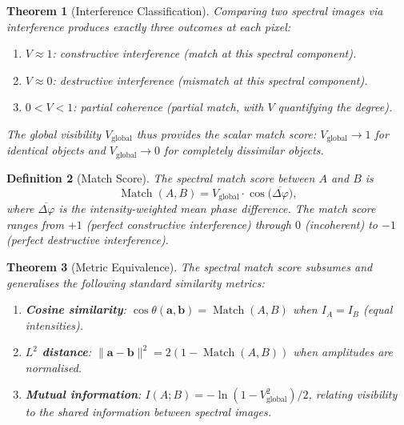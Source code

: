 \documentclass[11pt,twocolumn,a4paper]{article}
\newtheorem{theorem}{Theorem}[section]
\newtheorem{definition}[theorem]{Definition}
\DeclareMathOperator{\Match}{Match}
\begin{document}
\begin{theorem}[Interference Classification]
\label{thm:interference_classification}
Comparing two spectral images via interference produces exactly three
outcomes at each pixel:
\begin{enumerate}[label=(\roman*),nosep]
  \item $V \approx 1$: constructive interference (match at this spectral
    component).
  \item $V \approx 0$: destructive interference (mismatch at this
    spectral component).
  \item $0 < V < 1$: partial coherence (partial match, with $V$
    quantifying the degree).
\end{enumerate}
The global visibility $V_{\text{global}}$ thus provides the scalar
match score: $V_{\text{global}} \to 1$ for identical objects and
$V_{\text{global}} \to 0$ for completely dissimilar objects.
\end{theorem}

\begin{definition}[Match Score]
\label{def:match_score}
The spectral match score between $A$ and $B$ is
\begin{equation}
\label{eq:match_score}
  \Match(A, B) = V_{\text{global}} \cdot \cos\bigl(\overline{\Delta\varphi}\bigr),
\end{equation}
where $\overline{\Delta\varphi}$ is the intensity-weighted mean phase
difference. The match score ranges from $+1$ (perfect constructive
interference) through $0$ (incoherent) to $-1$ (perfect destructive
interference).
\end{definition}


\begin{theorem}[Metric Equivalence]
\label{thm:metric_equivalence}
The spectral match score subsumes and generalises the following standard
similarity metrics:
\begin{enumerate}[label=(\roman*),nosep]
  \item \textbf{Cosine similarity}: $\cos\theta(\mathbf{a}, \mathbf{b})
    = \Match(A, B)$ when $I_A = I_B$ (equal intensities).
  \item \textbf{$L^2$ distance}: $\|\mathbf{a} - \mathbf{b}\|^2 =
    2(1 - \Match(A, B))$ when amplitudes are normalised.
  \item \textbf{Mutual information}:
    $I(A; B) = -\ln(1 - V_{\text{global}}^2)/2$, relating visibility
    to the shared information between spectral images.
\end{enumerate}
\end{theorem}
\end{document}
